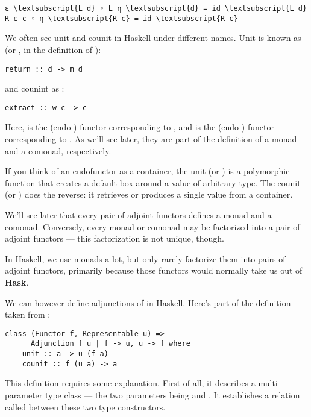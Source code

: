 \begin{Verbatim}[commandchars=\\\{\}]
ε \textsubscript{L d} ◦ L η \textsubscript{d} = id \textsubscript{L d}
R ε c ◦ η \textsubscript{R c} = id \textsubscript{R c}
\end{Verbatim}
We often see unit and counit in Haskell under different names. Unit is
known as  (or , in the definition of
):

\begin{Verbatim}[commandchars=\\\{\}]
return :: d -> m d
\end{Verbatim}
and counint as :

\begin{Verbatim}[commandchars=\\\{\}]
extract :: w c -> c
\end{Verbatim}
Here,  is the (endo-) functor corresponding to ,
and  is the (endo-) functor corresponding to . As
we'll see later, they are part of the definition of a monad and a
comonad, respectively.

If you think of an endofunctor as a container, the unit (or
) is a polymorphic function that creates a default box
around a value of arbitrary type. The counit (or ) does
the reverse: it retrieves or produces a single value from a container.

We'll see later that every pair of adjoint functors defines a monad and
a comonad. Conversely, every monad or comonad may be factorized into a
pair of adjoint functors --- this factorization is not unique, though.

In Haskell, we use monads a lot, but only rarely factorize them into
pairs of adjoint functors, primarily because those functors would
normally take us out of \textbf{Hask}.

We can however define adjunctions of  in Haskell.
Here's part of the definition taken from
:

\begin{Verbatim}[commandchars=\\\{\}]
class (Functor f, Representable u) =>
      Adjunction f u | f -> u, u -> f where
    unit :: a -> u (f a)
    counit :: f (u a) -> a
\end{Verbatim}
This definition requires some explanation. First of all, it describes a
multi-parameter type class --- the two parameters being  and
. It establishes a relation called  between
these two type constructors.

